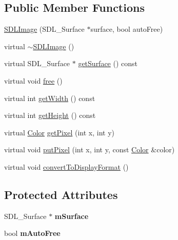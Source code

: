 \subsection*{Public Member Functions}
\begin{DoxyCompactItemize}
\item 
\hyperlink{classgcn_1_1SDLImage_a47271c3b3b77dc33af535a294ffbbaf5}{S\+D\+L\+Image} (S\+D\+L\+\_\+\+Surface $\ast$surface, bool auto\+Free)
\item 
virtual \hyperlink{classgcn_1_1SDLImage_aac706c9b974d455c78234019c8810bec}{$\sim$\+S\+D\+L\+Image} ()
\item 
virtual S\+D\+L\+\_\+\+Surface $\ast$ \hyperlink{classgcn_1_1SDLImage_a6de7994d61fbab88647d8554a17ff708}{get\+Surface} () const 
\item 
virtual void \hyperlink{classgcn_1_1SDLImage_a3bc4ad47bfe36987a48226a676f9f576}{free} ()
\item 
virtual int \hyperlink{classgcn_1_1SDLImage_aedda43f210a3e661685636684977eb1e}{get\+Width} () const 
\item 
virtual int \hyperlink{classgcn_1_1SDLImage_a92002975749328bf9c46c6a647b949d9}{get\+Height} () const 
\item 
virtual \hyperlink{classgcn_1_1Color}{Color} \hyperlink{classgcn_1_1SDLImage_af6f2df0d39d68b7c0547943f368f3726}{get\+Pixel} (int x, int y)
\item 
virtual void \hyperlink{classgcn_1_1SDLImage_a707af6ce207dff83174dd91dfd4b4148}{put\+Pixel} (int x, int y, const \hyperlink{classgcn_1_1Color}{Color} \&color)
\item 
virtual void \hyperlink{classgcn_1_1SDLImage_ad9b2c696a7c58af497c3830ad9d76861}{convert\+To\+Display\+Format} ()
\end{DoxyCompactItemize}
\subsection*{Protected Attributes}
\begin{DoxyCompactItemize}
\item 
S\+D\+L\+\_\+\+Surface $\ast$ {\bfseries m\+Surface}\hypertarget{classgcn_1_1SDLImage_a4bf5919ded9c1b71495746f54a6a54ff}{}\label{classgcn_1_1SDLImage_a4bf5919ded9c1b71495746f54a6a54ff}

\item 
bool {\bfseries m\+Auto\+Free}\hypertarget{classgcn_1_1SDLImage_a4cbb771d212e3f72773ef2e6fae20565}{}\label{classgcn_1_1SDLImage_a4cbb771d212e3f72773ef2e6fae20565}

\end{DoxyCompactItemize}
